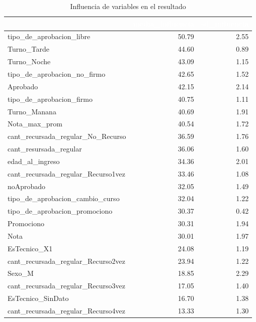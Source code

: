 \begin{table}[!h]
	
	\caption{\label{tab:tf_rfe_influencia_variables_23}Influencia de variables en el resultado}
	\centering
	\begin{tabular}[t]{lrr}
		\toprule
		\rowcolor{black}  \multicolumn{1}{c}{\textcolor{white}{\textbf{var}}} & \multicolumn{1}{c}{\textcolor{white}{\textbf{media\_influencia}}} & \multicolumn{1}{c}{\textcolor{white}{\textbf{sd\_influencia}}}\\
		\midrule
		\rowcolor{gray!6}  tipo\_de\_aprobacion\_libre & 50.79 & 2.55\\
		Turno\_Tarde & 44.60 & 0.89\\
		\rowcolor{gray!6}  Turno\_Noche & 43.09 & 1.15\\
		tipo\_de\_aprobacion\_no\_firmo & 42.65 & 1.52\\
		\rowcolor{gray!6}  Aprobado & 42.15 & 2.14\\
		\addlinespace
		tipo\_de\_aprobacion\_firmo & 40.75 & 1.11\\
		\rowcolor{gray!6}  Turno\_Manana & 40.69 & 1.91\\
		Nota\_max\_prom & 40.54 & 1.72\\
		\rowcolor{gray!6}  cant\_recursada\_regular\_No\_Recurso & 36.59 & 1.76\\
		cant\_resursada\_regular & 36.06 & 1.60\\
		\addlinespace
		\rowcolor{gray!6}  edad\_al\_ingreso & 34.36 & 2.01\\
		cant\_recursada\_regular\_Recurso1vez & 33.46 & 1.08\\
		\rowcolor{gray!6}  noAprobado & 32.05 & 1.49\\
		tipo\_de\_aprobacion\_cambio\_curso & 32.04 & 1.22\\
		\rowcolor{gray!6}  tipo\_de\_aprobacion\_promociono & 30.37 & 0.42\\
		\addlinespace
		Promociono & 30.31 & 1.94\\
		\rowcolor{gray!6}  Nota & 30.01 & 1.97\\
		EsTecnico\_X1 & 24.08 & 1.19\\
		\rowcolor{gray!6}  cant\_recursada\_regular\_Recurso2vez & 23.94 & 1.22\\
		Sexo\_M & 18.85 & 2.29\\
		\addlinespace
		\rowcolor{gray!6}  cant\_recursada\_regular\_Recurso3vez & 17.05 & 1.40\\
		EsTecnico\_SinDato & 16.70 & 1.38\\
		\rowcolor{gray!6}  cant\_recursada\_regular\_Recurso4vez & 13.33 & 1.30\\
		\bottomrule
	\end{tabular}
\end{table}


